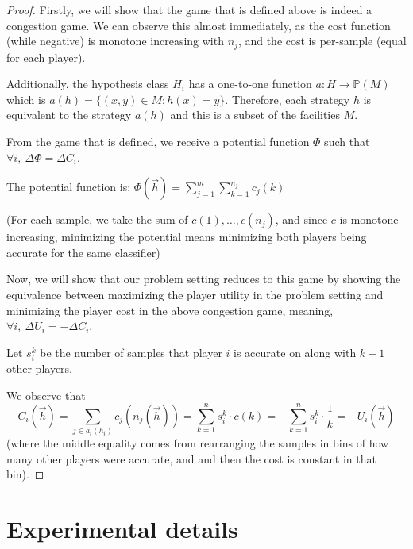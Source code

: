 \begin{proof}
    Firstly, we will show that the game that is defined above is indeed a congestion game.
    We can observe this almost immediately, as the cost function (while negative) is monotone increasing with $n_j$, and the cost is per-sample (equal for each player).
    
    Additionally, the hypothesis class $H_i$ has a one-to-one function $a:H \to \mathbb{P}(M)$ which is $a(h) = \{(x,y) \in M: h(x) = y\}$. Therefore, each strategy $h$ is equivalent to the strategy $a(h)$ and this is a subset of the facilities $M$.
    
    From the game that is defined, we receive a potential function $\Phi$ such that $ \forall i, \ \Delta \Phi = \Delta C_i$.

    The potential function is: $\Phi(\vec{h}) = \sum_{j=1}^m \sum_{k=1}^{n_j} c_j(k)$

    (For each sample, we take the sum of $c(1),\dots, c(n_j)$, and since $c$ is monotone increasing, minimizing the potential means minimizing both players being accurate for the same classifier)
    
    Now, we will show that our problem setting reduces to this game by showing the equivalence between maximizing the player utility in the problem setting and minimizing the player cost in the above congestion game, meaning,  $\forall i,\  \Delta U_i = - \Delta C_i $.
    
    Let $s_i^k$ be the number of samples that player $i$ is accurate on along with $k-1$ other players.
    
    We observe that $$C_i(\vec{h}) =\sum_{j \in a_i(h_i)} c_j(n_j(\vec{h})) = \sum_{k=1}^n s_i^k \cdot c(k) = -\sum_{k=1}^n s_i^k \cdot \frac{1}{k} = -U_i(\vec{h})$$
     (where the middle equality comes from rearranging the samples in bins of how many other players were accurate, and and then the cost is constant in that bin).

     
\end{proof} 


\section{Experimental details} \label{appx:exp_details}
